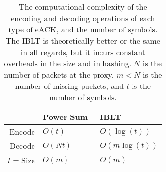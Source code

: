 \begin{table}[t]
    \centering
    \begin{tabular}{r l l}
        \toprule
        \bf & Power Sum~\cite{yuan2024sidekick} & IBLT \\
        \midrule
        Encode & $O(t)$ & $O(\log(t))$ \\
        Decode & $O(Nt)$ & $O(m\log(t))$ \\
        $t=$Size & $O(m)$ & $O(m)$ \\
        \bottomrule
    \end{tabular}
    \caption{The computational complexity of the encoding and decoding
    operations of each type of eACK, and the number of symbols. The IBLT
    is theoretically better or the same in all regards, but it
    incurs constant overheads in the size and in hashing.
    $N$ is the number of packets at the proxy, $m < N$ is the number of
     missing packets, and $t$ is the number of symbols.}
    \label{tab:quack-complexity}
\end{table}